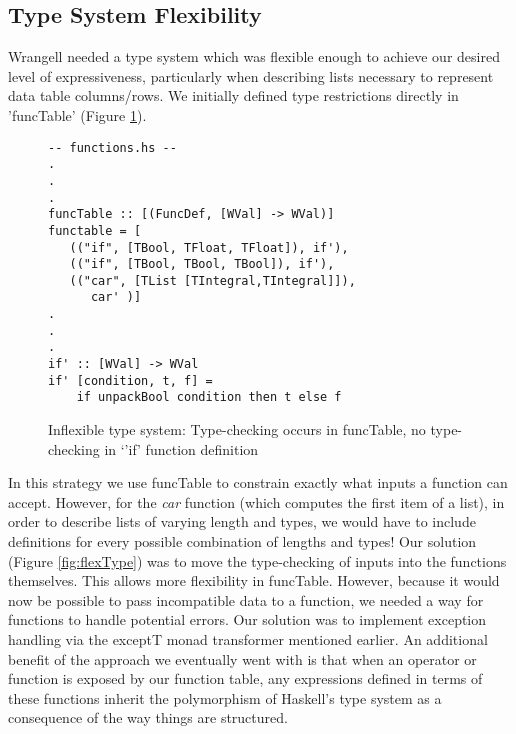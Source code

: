 \documentclass[preprint,nocopyrightspace]{sig-alternate}
\begin{document}
\subsection{Type System Flexibility}
Wrangell needed a type system which was flexible enough to achieve our desired level of expressiveness, particularly when describing lists necessary to represent data table columns/rows. We initially defined type restrictions directly in 'funcTable' (Figure \ref{fig:inflexType}).
\begin{figure}
\caption{Inflexible type system: Type-checking occurs in funcTable, no type-checking in `'if' function definition}
\begin{lstlisting}
-- functions.hs --
.
.
.
funcTable :: [(FuncDef, [WVal] -> WVal)] 
functable = [
   (("if", [TBool, TFloat, TFloat]), if'),
   (("if", [TBool, TBool, TBool]), if'),
   (("car", [TList [TIntegral,TIntegral]]), 
      car' )]    
.
.
.          
if' :: [WVal] -> WVal
if' [condition, t, f] = 
    if unpackBool condition then t else f

\end{lstlisting}
\label{fig:inflexType}
\end{figure}
In this strategy we use funcTable to constrain exactly what inputs a function can accept. However, for the \emph{car} function (which computes the first item of a list), in order to describe lists of varying length and types, we would have to include definitions for every possible combination of lengths and types!
Our solution (Figure \ref{fig:flexType}) was to move the type-checking of inputs into the functions themselves. This allows more flexibility in funcTable. However, because it would now be possible to pass incompatible data to a function, we needed a way for functions to handle potential errors. Our solution was to implement exception handling via the exceptT monad transformer mentioned earlier.
An additional benefit of the approach we eventually went with is that when an operator or function is exposed by our function table, any expressions defined in terms of these functions inherit the polymorphism of Haskell's type system as a consequence of the way things are structured.
\end{document}
